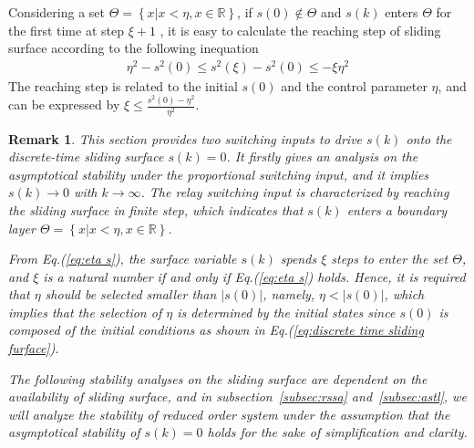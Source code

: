 \documentclass[10pt,onecolumn,draftcls]{IEEEtran}
\newtheorem{myrem}{Remark}
\begin{document}
	Considering a set $\Theta=\left\{x\left\vert x<\eta,x\in \mathbb{R}\right.\right\}$, if $s(0)\notin\Theta$ and $s(k)$ enters $\Theta$ for the first time at step $\xi+1$ , it is easy to calculate the reaching step of sliding surface according to the following inequation 
	\begin{align}\label{eq:eta s}
		\eta^2-s^2(0)\le s^2(\xi)-s^2(0)\le -\xi\eta^2
	\end{align}
	The reaching step is related to the initial $s(0)$ and the control parameter $\eta$, and can be expressed by $\xi\le\frac{s^2(0)-\eta^2}{\eta^2}$.
	\begin{myrem}
		This section provides two switching inputs to drive $s(k)$ onto the discrete-time sliding surface $s(k)=0$. It firstly gives an analysis on the asymptotical stability under the proportional switching input, and it implies $s(k)\to 0$ with $k\to\infty$. The relay switching input is characterized by reaching the sliding surface in finite step, which indicates that $s(k)$ enters a boundary layer $\Theta=\left\{x\left\vert x<\eta,x\in \mathbb{R}\right.\right\}$. 
		
		 From Eq.(\ref{eq:eta s}), the surface variable $s(k)$ spends $\xi$ steps to enter the set $\Theta$, and $\xi$ is a natural number if and only if Eq.(\ref{eq:eta s}) holds. Hence, it is required that $\eta$ should be selected smaller than $\vert s(0)\vert$, namely, $\eta<\vert s(0)\vert$, which implies that the selection of $\eta$ is determined by the initial states since $s(0)$ is composed of the initial conditions as shown in Eq.(\ref{eq:discrete time sliding furface}).
		
		The following stability analyses on the sliding surface are dependent on the availability of sliding surface, and in subsection~\ref{subsec:rssa} and~\ref{subsec:astl}, we will analyze the stability of reduced order system under the assumption that the asymptotical stability of $s(k)=0$ holds for the sake of simplification and clarity.
	\end{myrem}

\end{document}
